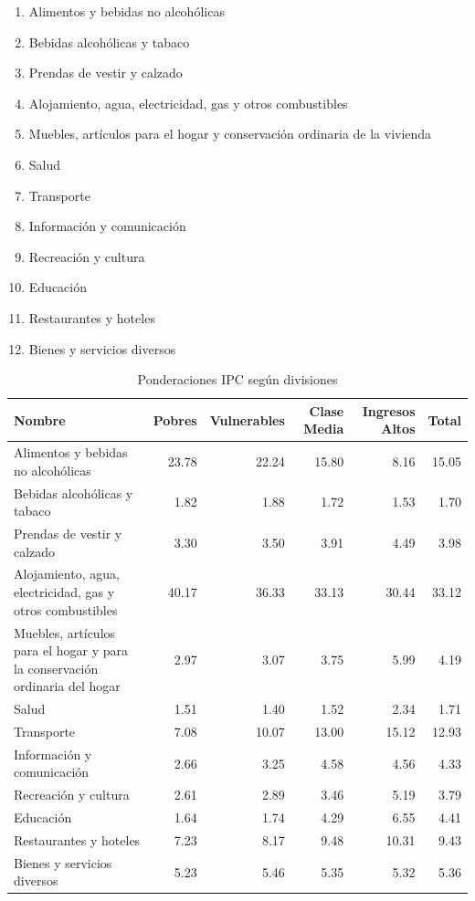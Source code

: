 \documentclass[
  11pt,
]{book}
\providecommand{\tightlist}{%
  \setlength{\itemsep}{0pt}\setlength{\parskip}{0pt}}
\begin{document}
\begin{enumerate}
\def\labelenumi{\arabic{enumi}.}
\tightlist
\item
  Alimentos y bebidas no alcohólicas
\item
  Bebidas alcohólicas y tabaco
\item
  Prendas de vestir y calzado
\item
  Alojamiento, agua, electricidad, gas y otros combustibles
\item
  Muebles, artículos para el hogar y conservación ordinaria de la vivienda
\item
  Salud
\item
  Transporte
\item
  Información y comunicación
\item
  Recreación y cultura
\item
  Educación
\item
  Restaurantes y hoteles
\item
  Bienes y servicios diversos
\end{enumerate}

\begin{table}

\caption{\label{tab:unnamed-chunk-9}Ponderaciones IPC según divisiones}
\centering
\begin{tabular}[t]{l|r|r|r|r|r}
\hline
Nombre & Pobres & Vulnerables & Clase Media & Ingresos Altos & Total\\
\hline
Alimentos y bebidas no alcohólicas & 23.78 & 22.24 & 15.80 & 8.16 & 15.05\\
\hline
Bebidas alcohólicas y tabaco & 1.82 & 1.88 & 1.72 & 1.53 & 1.70\\
\hline
Prendas de vestir y calzado & 3.30 & 3.50 & 3.91 & 4.49 & 3.98\\
\hline
Alojamiento, agua, electricidad, gas y otros combustibles & 40.17 & 36.33 & 33.13 & 30.44 & 33.12\\
\hline
Muebles, artículos para el hogar y para la conservación ordinaria del hogar & 2.97 & 3.07 & 3.75 & 5.99 & 4.19\\
\hline
Salud & 1.51 & 1.40 & 1.52 & 2.34 & 1.71\\
\hline
Transporte & 7.08 & 10.07 & 13.00 & 15.12 & 12.93\\
\hline
Información y comunicación & 2.66 & 3.25 & 4.58 & 4.56 & 4.33\\
\hline
Recreación y cultura & 2.61 & 2.89 & 3.46 & 5.19 & 3.79\\
\hline
Educación & 1.64 & 1.74 & 4.29 & 6.55 & 4.41\\
\hline
Restaurantes y hoteles & 7.23 & 8.17 & 9.48 & 10.31 & 9.43\\
\hline
Bienes y servicios diversos & 5.23 & 5.46 & 5.35 & 5.32 & 5.36\\
\hline
\end{tabular}
\end{table}
\end{document}
